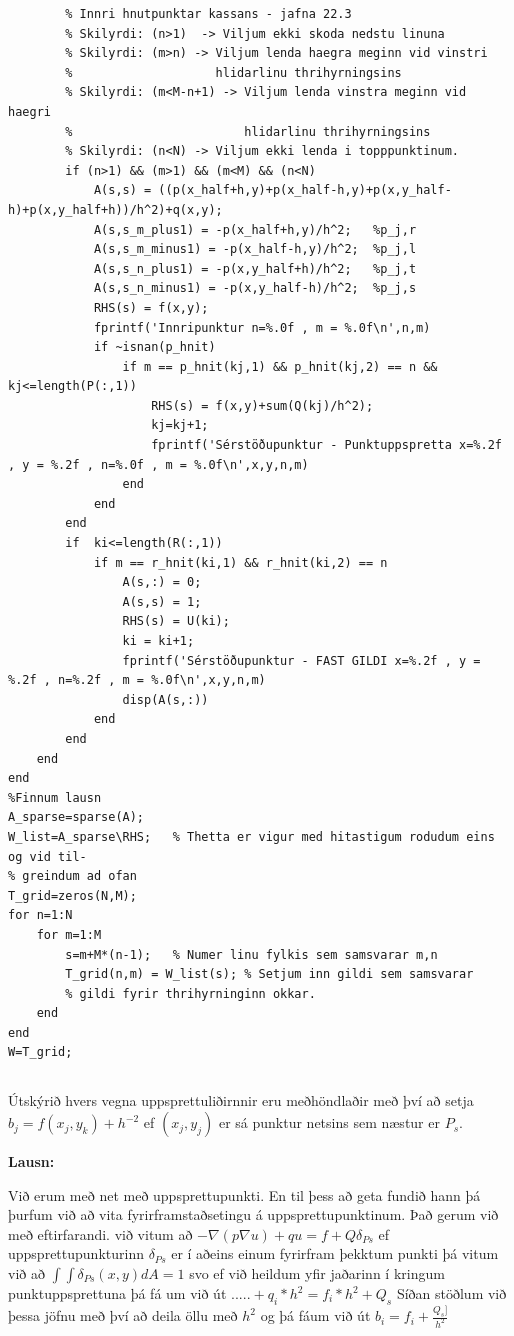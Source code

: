 \documentclass[11pt,a4paper,titlepage]{article}
\begin{document}
\begin{verbatim}
        % Innri hnutpunktar kassans - jafna 22.3
        % Skilyrdi: (n>1)  -> Viljum ekki skoda nedstu linuna
        % Skilyrdi: (m>n) -> Viljum lenda haegra meginn vid vinstri
        %                    hlidarlinu thrihyrningsins
        % Skilyrdi: (m<M-n+1) -> Viljum lenda vinstra meginn vid haegri
        %                        hlidarlinu thrihyrningsins
        % Skilyrdi: (n<N) -> Viljum ekki lenda i topppunktinum.
        if (n>1) && (m>1) && (m<M) && (n<N)
            A(s,s) = ((p(x_half+h,y)+p(x_half-h,y)+p(x,y_half-h)+p(x,y_half+h))/h^2)+q(x,y);
            A(s,s_m_plus1) = -p(x_half+h,y)/h^2;   %p_j,r
            A(s,s_m_minus1) = -p(x_half-h,y)/h^2;  %p_j,l
            A(s,s_n_plus1) = -p(x,y_half+h)/h^2;   %p_j,t
            A(s,s_n_minus1) = -p(x,y_half-h)/h^2;  %p_j,s
            RHS(s) = f(x,y);
            fprintf('Innripunktur n=%.0f , m = %.0f\n',n,m)
            if ~isnan(p_hnit)
                if m == p_hnit(kj,1) && p_hnit(kj,2) == n && kj<=length(P(:,1))
                    RHS(s) = f(x,y)+sum(Q(kj)/h^2);
                    kj=kj+1;
                    fprintf('Sérstöðupunktur - Punktuppspretta x=%.2f , y = %.2f , n=%.0f , m = %.0f\n',x,y,n,m)
                end
            end
        end
        if  ki<=length(R(:,1))
            if m == r_hnit(ki,1) && r_hnit(ki,2) == n 
                A(s,:) = 0;
                A(s,s) = 1;
                RHS(s) = U(ki);
                ki = ki+1;
                fprintf('Sérstöðupunktur - FAST GILDI x=%.2f , y = %.2f , n=%.2f , m = %.0f\n',x,y,n,m)
                disp(A(s,:))
            end
        end
    end
end
%Finnum lausn
A_sparse=sparse(A);
W_list=A_sparse\RHS;   % Thetta er vigur med hitastigum rodudum eins og vid til-
% greindum ad ofan
T_grid=zeros(N,M);
for n=1:N
    for m=1:M
        s=m+M*(n-1);   % Numer linu fylkis sem samsvarar m,n
        T_grid(n,m) = W_list(s); % Setjum inn gildi sem samsvarar
        % gildi fyrir thrihyrninginn okkar.
    end
end
W=T_grid;

\end{verbatim}
\subsection{}
Útskýrið hvers vegna uppsprettuliðirnnir eru meðhöndlaðir með því að setja $b_{j} = f(x_{j},y_{k})+h^{-2}$ ef $(x_{j},y_{j})$ er sá punktur netsins sem næstur er $P_s$.  

\par
\textbf{Lausn:}\par
Við erum með net með uppsprettupunkti.  En til þess að geta fundið hann þá þurfum við að vita fyrirframstaðsetingu á uppsprettupunktinum. 
Það gerum við með eftirfarandi.
við vitum að  
$-\nabla(p \nabla u) + qu= f +Q \delta_{Ps}$ 
ef uppsprettupunkturinn $\delta_{Ps}$ er í aðeins einum fyrirfram þekktum punkti þá vitum við að 
$\int \int \delta_{Ps}(x,y)dA=1$ 
 svo ef við heildum yfir jaðarinn í kringum punktuppsprettuna þá fá um við út 
 $.....+q_i*h^2=f_i*h^2+Q_s$
 Síðan stöðlum við þessa jöfnu með því að deila öllu með $h^2$
 og þá fáum við út 
 $b_i= f_i+\frac{Q_s]}{h^2}$
\end{document}

